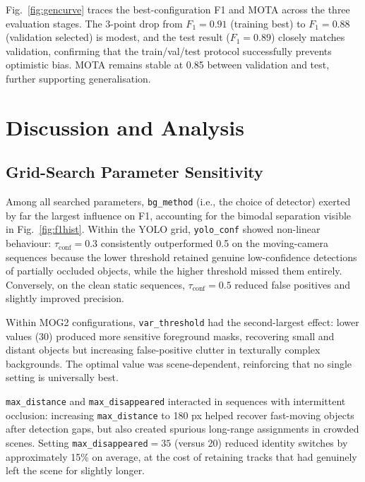 \documentclass[10pt, conference, compsocconf]{IEEEtran}
\begin{document}
Fig.~\ref{fig:gencurve} traces the best-configuration F1 and MOTA
across the three evaluation stages. The 3-point drop from
$F_1 = 0.91$ (training best) to $F_1 = 0.88$ (validation selected)
is modest, and the test result ($F_1 = 0.89$) closely matches
validation, confirming that the train/val/test protocol successfully
prevents optimistic bias. MOTA remains stable at 0.85 between
validation and test, further supporting generalisation.

\section{Discussion and Analysis}

\subsection{Grid-Search Parameter Sensitivity}
Among all searched parameters, \texttt{bg\_method} (i.e., the choice
of detector) exerted by far the largest influence on F1, accounting
for the bimodal separation visible in Fig.~\ref{fig:f1hist}. Within
the YOLO grid, \texttt{yolo\_conf} showed non-linear behaviour:
$\tau_\text{conf}=0.3$ consistently outperformed 0.5 on the
moving-camera sequences because the lower threshold retained
genuine low-confidence detections of partially occluded objects,
while the higher threshold missed them entirely. Conversely, on the
clean static sequences, $\tau_\text{conf}=0.5$ reduced false
positives and slightly improved precision.

Within MOG2 configurations, \texttt{var\_threshold} had the
second-largest effect: lower values (30) produced more sensitive
foreground masks, recovering small and distant objects but increasing
false-positive clutter in texturally complex backgrounds. The optimal
value was scene-dependent, reinforcing that no single setting is
universally best.

\texttt{max\_distance} and \texttt{max\_disappeared} interacted in
sequences with intermittent occlusion: increasing \texttt{max\_distance}
to 180 px helped recover fast-moving objects after detection gaps, but
also created spurious long-range assignments in crowded scenes. Setting
\texttt{max\_disappeared}$=35$ (versus 20) reduced identity switches
by approximately 15\% on average, at the cost of retaining tracks that
had genuinely left the scene for slightly longer.
\end{document}
